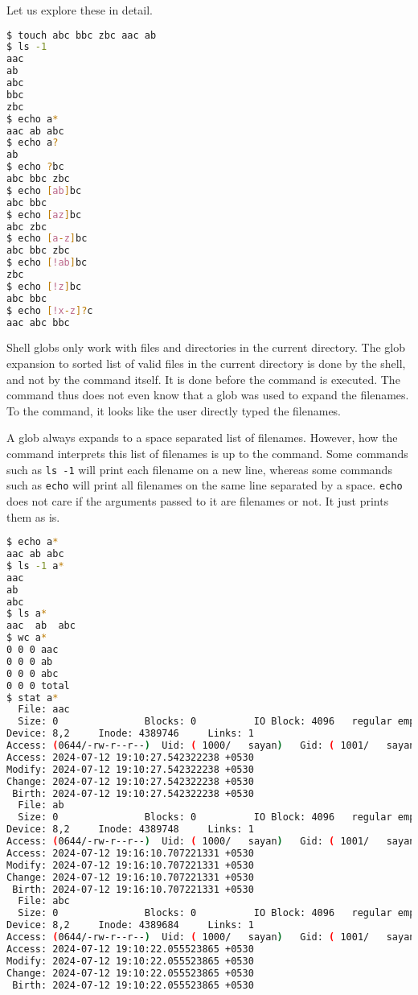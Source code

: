 Let us explore these in detail.


\begin{lstlisting}[language=bash]
$ touch abc bbc zbc aac ab
$ ls -1
aac
ab
abc
bbc
zbc
$ echo a*
aac ab abc
$ echo a?
ab
$ echo ?bc
abc bbc zbc
$ echo [ab]bc
abc bbc
$ echo [az]bc
abc zbc
$ echo [a-z]bc
abc bbc zbc
$ echo [!ab]bc
zbc
$ echo [!z]bc
abc bbc
$ echo [!x-z]?c
aac abc bbc
\end{lstlisting}

Shell globs only work with files and directories in the current directory.
The glob expansion to sorted list of valid files in the current directory
is done by the shell, and not by the command itself. It is done before the
command is executed. The command thus does not even know that a glob was
used to expand the filenames. To the command, it looks like the user
directly typed the filenames.

A glob always expands to a space separated list of filenames. However, how
the command interprets this list of filenames is up to the command. Some
commands such as \texttt{ls -1} will print each filename on a new line,
whereas some commands such as \texttt{echo} will print all filenames on
the same line separated by a space. \texttt{echo} does not care if the
arguments passed to it are filenames or not. It just prints them as is.

\begin{lstlisting}[language=bash]
$ echo a*
aac ab abc
$ ls -1 a*
aac
ab
abc
$ ls a*
aac  ab  abc
$ wc a*
0 0 0 aac
0 0 0 ab
0 0 0 abc
0 0 0 total
$ stat a*
  File: aac
  Size: 0               Blocks: 0          IO Block: 4096   regular empty file
Device: 8,2     Inode: 4389746     Links: 1
Access: (0644/-rw-r--r--)  Uid: ( 1000/   sayan)   Gid: ( 1001/   sayan)
Access: 2024-07-12 19:10:27.542322238 +0530
Modify: 2024-07-12 19:10:27.542322238 +0530
Change: 2024-07-12 19:10:27.542322238 +0530
 Birth: 2024-07-12 19:10:27.542322238 +0530
  File: ab
  Size: 0               Blocks: 0          IO Block: 4096   regular empty file
Device: 8,2     Inode: 4389748     Links: 1
Access: (0644/-rw-r--r--)  Uid: ( 1000/   sayan)   Gid: ( 1001/   sayan)
Access: 2024-07-12 19:16:10.707221331 +0530
Modify: 2024-07-12 19:16:10.707221331 +0530
Change: 2024-07-12 19:16:10.707221331 +0530
 Birth: 2024-07-12 19:16:10.707221331 +0530
  File: abc
  Size: 0               Blocks: 0          IO Block: 4096   regular empty file
Device: 8,2     Inode: 4389684     Links: 1
Access: (0644/-rw-r--r--)  Uid: ( 1000/   sayan)   Gid: ( 1001/   sayan)
Access: 2024-07-12 19:10:22.055523865 +0530
Modify: 2024-07-12 19:10:22.055523865 +0530
Change: 2024-07-12 19:10:22.055523865 +0530
 Birth: 2024-07-12 19:10:22.055523865 +0530
\end{lstlisting}

